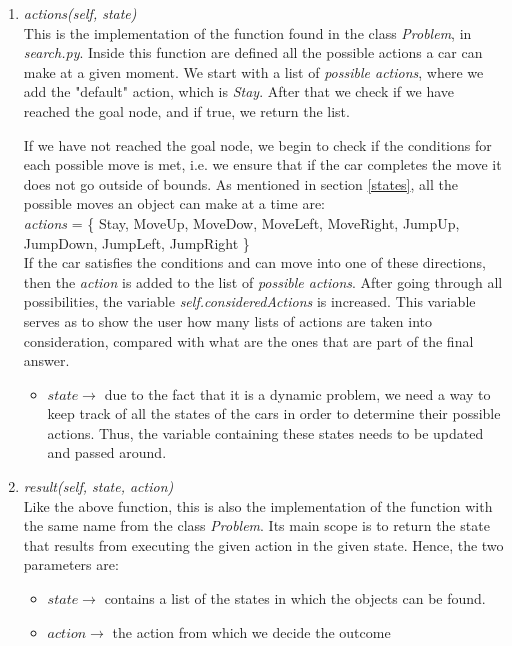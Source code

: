 \documentclass{article}
\begin{document}
\begin{enumerate}[label=\Roman*]
\begin{enumerate}
    \item \emph{actions(\emph{self}, state)} \\
    This is the implementation of the function found in the class \emph{Problem}, in \emph{search.py}. Inside this function are defined all the possible actions a car can make at a given moment. We start with a list of \emph{possible actions}, where we add the "default" action, which is \emph{Stay}. After that we check if we have reached the goal node, and if true, we return the list. 
    
    If we have not reached the goal node, we begin to check if the conditions for each possible move is met, i.e. we ensure that if the car completes the move it does not go outside of bounds. As mentioned in section \ref{states}, all the possible moves an object can make at a time are: \\

    \emph{actions} = \{ Stay, MoveUp, MoveDow, MoveLeft, MoveRight, JumpUp, JumpDown, JumpLeft, JumpRight \} \\

    If the car satisfies the conditions and can move into one of these directions, then the \emph{action} is added to the list of \emph{possible actions}. After going through all possibilities, the variable \emph{self.consideredActions} is increased. This variable serves as to show the user how many lists of actions are taken into consideration, compared with what are the ones that are part of the final answer.
    
    \begin{itemize}
        \item $state \rightarrow$ due to the fact that it is a dynamic problem, we need a way to keep track of all the states of the cars in order to determine their possible actions. Thus, the variable containing these states needs to be updated and passed around.
    \end{itemize}         
         
    \item \emph{result(\emph{self}, state, action)} \\
    Like the above function, this is also the implementation of the function with the same name from the class \emph{Problem}. Its main scope is to return the state that results from executing the given action in the given state. Hence, the two parameters are:
    
\begin{itemize}
    \item $state \rightarrow$ contains a list of the states in which the objects can be found.
    \item $action \rightarrow$ the action from which we decide the outcome
\end{itemize}
         

\end{enumerate}
\end{enumerate}
\end{document}
